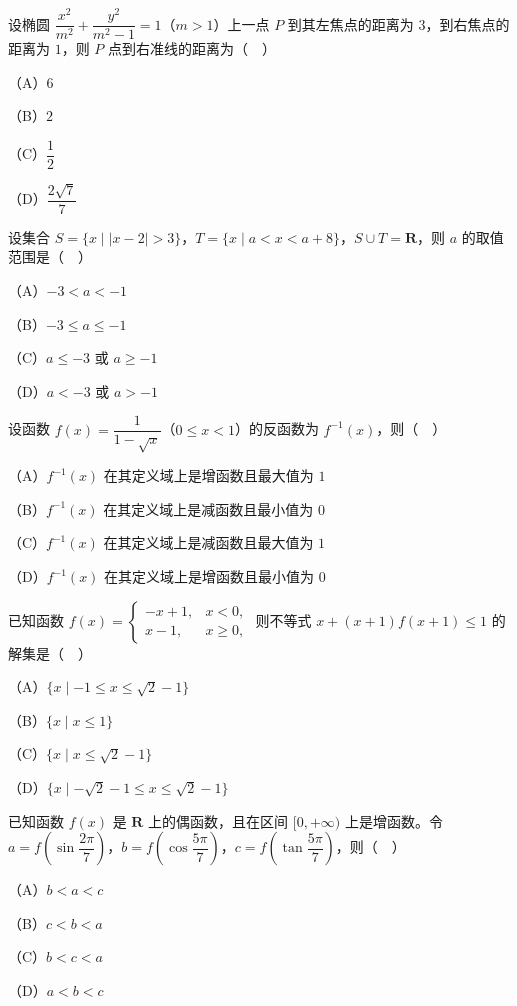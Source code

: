 \begin{question}
设椭圆 $\dfrac{x^2}{m^2}+\dfrac{y^2}{m^2-1}=1$（$m>1$）上一点 $P$ 到其左焦点的距离为 $3$，到右焦点的距离为 $1$，则 $P$ 点到右准线的距离为（　）

（A）$6$

（B）$2$

（C）$\dfrac12$

（D）$\dfrac{2\sqrt7}7$

\end{question}
\begin{question}
设集合 $S=\{x\mid|x-2|>3\}$，$T=\{x\mid a<x<a+8\}$，$S\cup T=\mathbf R$，则 $a$ 的取值范围是（　）

（A）$-3<a<-1$

（B）$-3\leqslant a\leqslant-1$

（C）$a\leqslant-3$ 或 $a\geqslant-1$

（D）$a<-3$ 或 $a>-1$

\end{question}
\begin{question}
设函数 $f(x)=\dfrac1{1-\sqrt x}$（$0\leqslant x<1$）的反函数为 $f^{-1}(x)$，则（　）

（A）$f^{-1}(x)$ 在其定义域上是增函数且最大值为 $1$

（B）$f^{-1}(x)$ 在其定义域上是减函数且最小值为 $0$

（C）$f^{-1}(x)$ 在其定义域上是减函数且最大值为 $1$

（D）$f^{-1}(x)$ 在其定义域上是增函数且最小值为 $0$

\end{question}
\begin{question}
已知函数 $f(x)=\begin{cases}-x+1,&x<0,\\ x-1,&x\geqslant0,\end{cases}$ 则不等式 $x+(x+1)f(x+1)\leqslant1$ 的解集是（　）

（A）$\{x\mid-1\leqslant x\leqslant\sqrt2-1\}$

（B）$\{x\mid x\leqslant1\}$

（C）$\{x\mid x\leqslant\sqrt2-1\}$

（D）$\{x\mid-\sqrt2-1\leqslant x\leqslant\sqrt2-1\}$

\end{question}
\begin{question}
已知函数 $f(x)$ 是 $\mathbf R$ 上的偶函数，且在区间 $[0,+\infty)$ 上是增函数。令 $a=f\left(\sin\dfrac{2\pi}7\right)$，$b=f\left(\cos\dfrac{5\pi}7\right)$，$c=f\left(\tan\dfrac{5\pi}7\right)$，则（　）

（A）$b<a<c$

（B）$c<b<a$

（C）$b<c<a$

（D）$a<b<c$

\end{question}
